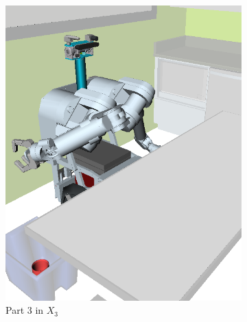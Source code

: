 {\begin{figure}[t]
\begin{widepage}
\begin{center}
\begin{subfigure}[t]{0.19\linewidth}
\includegraphics[width=\columnwidth]{figs/testherb-d.png}
\caption{Part 3 in $X_3$}
\end{subfigure}
\begin{subfigure}[t]{0.19\linewidth}
\centering

\end{subfigure}
\end{center}
\end{widepage}
\end{figure}}
